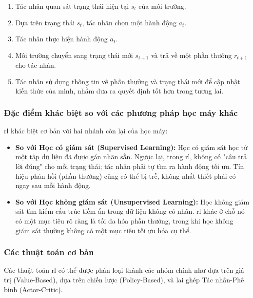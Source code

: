 \begin{enumerate}
\begin{enumerate}
    \item Tác nhân quan sát trạng thái hiện tại $s_{t}$ của môi trường.

    \item Dựa trên trạng thái $s_{t}$, tác nhân chọn một hành động $a_{t}$.

    \item Tác nhân thực hiện hành động $a_{t}$.

    \item Môi trường chuyển sang trạng thái mới $s_{t+1}$ và trả về một phần thưởng        $r_{t+1}$ cho tác nhân.

    \item Tác nhân sử dụng thông tin về phần thưởng và trạng thái mới để cập nhật kiến thức của mình, nhằm đưa ra quyết định tốt hơn trong tương lai.
\end{enumerate}

\subsubsection{Đặc điểm khác biệt so với các phương pháp học máy khác}
\ac{rl} khác biệt cơ bản với hai nhánh còn lại của học máy:
\begin{itemize}
    \item \textbf{So với Học có giám sát (Supervised Learning):} Học có giám sát
        học từ một tập dữ liệu đã được gán nhãn sẵn. Ngược lại, trong \ac{rl},
        không có "câu trả lời đúng" cho mỗi trạng thái; tác nhân phải tự tìm ra hành
        động tối ưu. Tín hiệu phản hồi (phần thưởng) cũng có thể bị trễ, không nhất
        thiết phải có ngay sau mỗi hành động.

    \item \textbf{So với Học không giám sát (Unsupervised Learning):} Học không
        giám sát tìm kiếm cấu trúc tiềm ẩn trong dữ liệu không có nhãn. \ac{rl}
        khác ở chỗ nó có một mục tiêu rõ ràng là tối đa hóa phần thưởng, trong khi
        học không giám sát thường không có một mục tiêu tối ưu hóa cụ thể.
\end{itemize}

\subsubsection{Các thuật toán cơ bản}
Các thuật toán \ac{rl} có thể được phân loại thành các nhóm chính như dựa trên giá
trị (Value-Based), dựa trên chiến lược (Policy-Based), và lai ghép Tác nhân-Phê bình
(Actor-Critic).


\end{enumerate}
